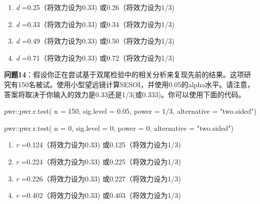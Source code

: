 \documentclass[
  letterpaper,
  DIV=11,
  numbers=noendperiod]{scrreprt}
\newenvironment{Shaded}{\begin{snugshade}}{\end{snugshade}}
\newcommand{\AttributeTok}[1]{\textcolor[rgb]{0.40,0.45,0.13}{#1}}
\newcommand{\DecValTok}[1]{\textcolor[rgb]{0.68,0.00,0.00}{#1}}
\newcommand{\FloatTok}[1]{\textcolor[rgb]{0.68,0.00,0.00}{#1}}
\newcommand{\FunctionTok}[1]{\textcolor[rgb]{0.28,0.35,0.67}{#1}}
\newcommand{\NormalTok}[1]{\textcolor[rgb]{0.00,0.23,0.31}{#1}}
\newcommand{\SpecialCharTok}[1]{\textcolor[rgb]{0.37,0.37,0.37}{#1}}
\newcommand{\StringTok}[1]{\textcolor[rgb]{0.13,0.47,0.30}{#1}}
\providecommand{\tightlist}{%
  \setlength{\itemsep}{0pt}\setlength{\parskip}{0pt}}\usepackage{longtable,booktabs,array}
\begin{document}
\begin{enumerate}
\def\labelenumi{\Alph{enumi})}
\tightlist
\item
  \emph{d} =0.25（将效力设为0.33) 或0.26（将效力设为1/3)
\item
  \emph{d} =0.33（将效力设为0.33) 或0.34（将效力设为1/3)
\item
  \emph{d} =0.49（将效力设为0.33) 或0.50（将效力设为1/3)
\item
  \emph{d} =0.71（将效力设为0.33) 或0.72（将效力设为1/3)
\end{enumerate}

\textbf{问题14}：假设你正在尝试基于双尾检验中的相关分析来复现先前的结果。这项研究有150名被试。使用小型望远镜计算SESOI，并使用0.05的alpha水平。请注意，答案将取决于你输入的效力是0.33还是1/3(或0.333)。你可以使用下面的代码。

\begin{Shaded}
\begin{Highlighting}[]
\NormalTok{pwr}\SpecialCharTok{::}\FunctionTok{pwr.r.test}\NormalTok{(}
  \AttributeTok{n =} \DecValTok{150}\NormalTok{,}
  \AttributeTok{sig.level =} \FloatTok{0.05}\NormalTok{,}
  \AttributeTok{power =} \DecValTok{1}\SpecialCharTok{/}\DecValTok{3}\NormalTok{,}
  \AttributeTok{alternative =} \StringTok{"two.sided"}\NormalTok{)}
\end{Highlighting}
\end{Shaded}

\begin{Shaded}
\begin{Highlighting}[]
\NormalTok{pwr}\SpecialCharTok{::}\FunctionTok{pwr.r.test}\NormalTok{(}
  \AttributeTok{n =} \DecValTok{0}\NormalTok{, }
  \AttributeTok{sig.level =} \DecValTok{0}\NormalTok{, }
  \AttributeTok{power =} \DecValTok{0}\NormalTok{, }
  \AttributeTok{alternative =} \StringTok{"two.sided"}\NormalTok{)}
\end{Highlighting}
\end{Shaded}

\begin{enumerate}
\def\labelenumi{\Alph{enumi})}
\tightlist
\item
  \emph{r} =0.124（将效力设为0.33) 或0.125（将效力设为1/3)
\item
  \emph{r} =0.224（将效力设为0.33) 或0.225（将效力设为1/3)
\item
  \emph{r} =0.226（将效力设为0.33) 或0.227（将效力设为1/3)
\item
  \emph{r} =0.402（将效力设为0.33) 或0.403（将效力设为1/3)
\end{enumerate}
\end{document}
